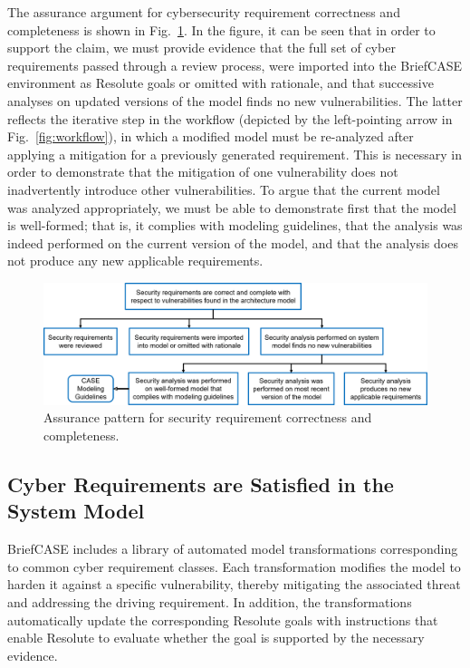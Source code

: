 The assurance argument for cybersecurity requirement correctness and completeness is shown in Fig.~\ref{fig:req-correct-complete}.  
%
In the figure, it can be seen that in order to support the claim, we must provide evidence that the full set of cyber requirements passed through a review process, were imported into the BriefCASE environment as Resolute goals or omitted with rationale, and that successive analyses on updated versions of the model finds no new vulnerabilities.  The latter reflects the iterative step in the workflow (depicted by the left-pointing arrow in Fig.~\ref{fig:workflow}), in which a modified model must be re-analyzed after applying a mitigation for a previously generated requirement.  This is necessary in order to demonstrate that the mitigation of one vulnerability does not inadvertently introduce other vulnerabilities.  To argue that the current model was analyzed appropriately, we must be able to demonstrate first that the model is well-formed; that is, it complies with modeling guidelines, that the analysis was indeed performed on the current version of the model, and that the analysis does not produce any new applicable requirements.

\begin{figure}[h] 
	\centering 
	\includegraphics[width=\textwidth]{figs/req-correct-complete.png}
	\caption{Assurance pattern for security requirement correctness and completeness.}
	\label{fig:req-correct-complete} 
\end{figure}

\subsection{Cyber Requirements are Satisfied in the System Model}
\label{sec:requirements-satisfied-in-model}
BriefCASE includes a library of automated model transformations corresponding to common cyber requirement classes.  Each transformation modifies the model to harden it against a specific vulnerability, thereby mitigating the associated threat and addressing the driving requirement.  In addition, the transformations automatically update the corresponding Resolute goals with instructions that enable Resolute to evaluate whether the goal is supported by the necessary evidence.

